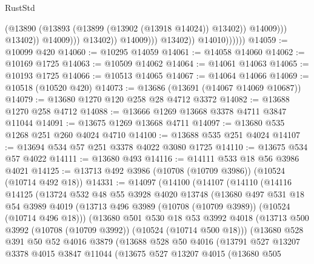 \begin{lexlean}{RustStd}
\begin{coremodule}
                                            (@13890
                                              (@13893 (@13899 (@13902 (@13918 @14024)) @13402))
                                              @14009)))
                                        @13402))
                                    @14009)))
                              @13402))
                          @14009)))
                    @13402))
                @14010))))))
@14059 := @10099 @420
@14060 := @10295 @14059
@14061 := @14058 @14060
@14062 := @10169 @1725
@14063 := @10509 @14062
@14064 := @14061 @14063
@14065 := @10193 @1725
@14066 := @10513 @14065
@14067 := @14064 @14066
@14069 := @10518 (@10520 @420)
@14073 := @13686 (@13691 (@14067 @14069 @10687))
@14079 := @13680 @1270 @120 @258 @28 @4712 @3372
@14082 := @13688 @1270 @258 @4712
@14088 := @13666 @1269 @13668 @3378 @4711 @3847 @11044
@14091 := @13675 @1269 @13668 @4711
@14097 := @13680 @535 @1268 @251 @260 @4024 @4710
@14100 := @13688 @535 @251 @4024
@14107 := @13694 @534 @57 @251 @3378 @4022 @3080 @1725
@14110 := @13675 @534 @57 @4022
@14111 := @13680 @493
@14116 := @14111 @533 @18 @56 @3986 @4021
@14125 := @13713 @492 @3986 (@10708 (@10709 @3986)) (@10524 (@10714 @492 @18))
@14331 := @14097
    (@14100
      (@14107
        (@14110
          (@14116
            @14125
            (@13724
              @532
              @48
              @55
              @3928
              @4020
              @13748
              (@13680
                @497
                @531
                @18
                @54
                @3989
                @4019
                (@13713 @496 @3989 (@10708 (@10709 @3989)) (@10524 (@10714 @496 @18)))
                (@13680
                  @501
                  @530
                  @18
                  @53
                  @3992
                  @4018
                  (@13713 @500 @3992 (@10708 (@10709 @3992)) (@10524 (@10714 @500 @18)))
                  (@13680
                    @528
                    @391
                    @50
                    @52
                    @4016
                    @3879
                    (@13688
                      @528
                      @50
                      @4016
                      (@13791
                        @527
                        @13207
                        @3378
                        @4015
                        @3847
                        @11044
                        (@13675
                          @527
                          @13207
                          @4015
                          (@13680
                            @505

\end{coremodule}
\end{lexlean}
